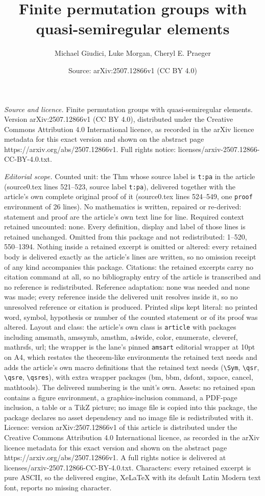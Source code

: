 \documentclass[10pt,a4paper]{amsart}
\title[Finite permutation groups with quasi-semiregular elements]{Finite permutation groups with quasi-semiregular elements}
\author{Michael Giudici, Luke Morgan, Cheryl E. Praeger}
\date{Source: arXiv:2507.12866v1 (CC BY 4.0)}
\begin{document}
\maketitle

\noindent\emph{Source and licence.} Finite permutation groups with quasi-semiregular elements. Version arXiv:2507.12866v1 (CC BY 4.0), distributed under the Creative Commons Attribution 4.0 International licence, as recorded in the arXiv licence metadata for this exact version and shown on the abstract page https://arxiv.org/abs/2507.12866v1. Full rights notice: licenses/arxiv-2507.12866-CC-BY-4.0.txt.\par\smallskip

\noindent\textit{Editorial scope.} Counted unit: the Thm whose source label is \texttt{t:pa} in the article (source0.tex lines 521--523, source label \texttt{t:pa}), delivered together with the article's own complete original proof of it (source0.tex lines 524--549, one \texttt{proof} environment of 26 lines). No mathematics is written, repaired or re-derived: statement and proof are the article's own text line for line. Required context retained uncounted: none. Every definition, display and label of those lines is retained unchanged. Omitted from this package and not redistributed: 1--520, 550--1394. Nothing inside a retained excerpt is omitted or altered: every retained body is delivered exactly as the article's lines are written, so no omission receipt of any kind accompanies this package. Citations: the retained excerpts carry no citation command at all, so no bibliography entry of the article is transcribed and no reference is redistributed. Reference adaptation: none was needed and none was made; every reference inside the delivered unit resolves inside it, so no unresolved reference or citation is produced. Printed slips kept literal: no printed word, symbol, hypothesis or number of the counted statement or of its proof was altered. Layout and class: the article's own class is \texttt{article} with packages including amsmath, amssymb, amsthm, a4wide, color, enumerate, cleveref, mathrsfs, url; the wrapper is the lane's pinned \texttt{amsart} editorial wrapper at 10pt on A4, which restates the theorem-like environments the retained text needs and adds the article's own macro definitions that the retained text needs (\texttt{\textbackslash Sym}, \texttt{\textbackslash qsr}, \texttt{\textbackslash qsre}, \texttt{\textbackslash qsres}), with extra wrapper packages (bm, bbm, dsfont, xspace, cancel, mathtools). The delivered numbering is the unit's own. Assets: no retained span contains a figure environment, a graphics-inclusion command, a PDF-page inclusion, a table or a TikZ picture; no image file is copied into this package, the package declares no asset dependency and no image file is redistributed with it. Licence: version arXiv:2507.12866v1 of this article is distributed under the Creative Commons Attribution 4.0 International licence, as recorded in the arXiv licence metadata for this exact version and shown on the abstract page https://arxiv.org/abs/2507.12866v1. A full rights notice is delivered at licenses/arxiv-2507.12866-CC-BY-4.0.txt. Characters: every retained excerpt is pure ASCII, so the delivered engine, XeLaTeX with its default Latin Modern text font, reports no missing character.
\end{document}
